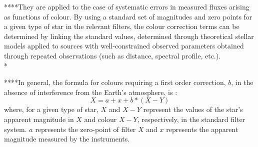 
****They are applied to the case of systematic errors in measured fluxes arising as functions of colour. By using a standard set of magnitudes and zero points for a given type of star in the relevant filters, the colour correction terms can be determined by linking the standard values, determined through theoretical stellar models applied to sources with well-constrained observed parameters obtained through repeated observations (such as distance, spectral profile, etc.).\\*


****In general, the formula for colours requiring a first order correction, $b$, in the absence of interference from the Earth's atmosphere, is \citep{2000PASA...17..244S}:
\begin{equation}
 X  =  a  +  x  + b * (X-Y)
\label{color_correction_eq}
\end{equation}
where, for a given type of star, $X$ and $X-Y$ represent the values of the star's apparent magnitude in $X$ and colour $X-Y$, respectively, in the standard filter system. $a$ represents the zero-point of filter $X$ and $x$ represents the apparent magnitude measured by the instruments.


